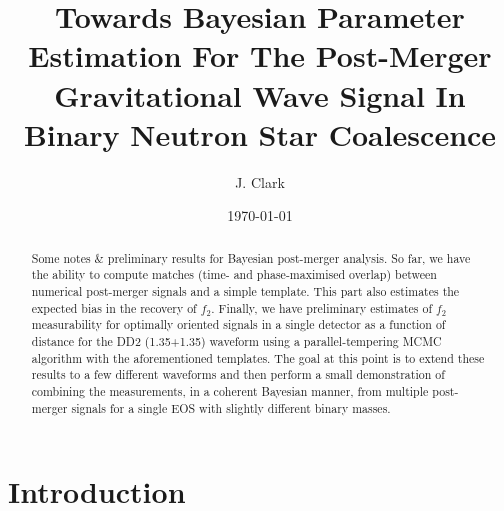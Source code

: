 \documentclass[showpacs, superscriptaddress, showpacs, letterpaper, showkeys,
preprintnumbers, altaffilletter, amssymb, amsmath, amsfonts, prd,
onecolumn, floatfix, nofootinbib]{revtex4-1}
\begin{document}
\title{Towards Bayesian Parameter Estimation For The Post-Merger Gravitational
Wave Signal In Binary Neutron Star Coalescence}

\author{J. Clark}

\date{\today}


\begin{abstract}
Some notes \& preliminary results for Bayesian post-merger analysis.  So far, we
have the ability to compute matches (time- and phase-maximised overlap) between
numerical post-merger signals and a simple template.  This part also estimates
the expected bias in the recovery of $f_2$.  Finally,  we have preliminary
estimates of $f_2$ measurability for optimally oriented signals in a single
detector as a function of distance for the DD2 (1.35+1.35) waveform using a
parallel-tempering MCMC algorithm with the aforementioned templates.  The goal
at this point is to extend these results to a few different waveforms and then
perform a small demonstration of combining the measurements, in a coherent
Bayesian manner, from multiple post-merger signals for a single EOS with
slightly different binary masses.  
\end{abstract}

%

\maketitle
\section{Introduction}
%
\end{document}
